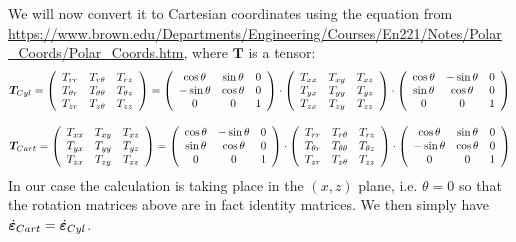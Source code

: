We will now convert it to Cartesian coordinates using the equation 
from \url{https://www.brown.edu/Departments/Engineering/Courses/En221/Notes/Polar_Coords/Polar_Coords.htm}, where ${\bm T}$ is a tensor:
\[
{\bm T}_{\tiny Cyl}=
\left(
\begin{array}{ccc}
T_{rr}       & T_{r\theta}      & T_{rz} \\
T_{\theta r} & T_{\theta\theta} & T_{\theta z} \\
T_{z r}      & T_{z \theta}     & T_{zz}
\end{array}
\right)
=
\left(
\begin{array}{ccc}
 \cos \theta&\sin \theta&0 \\
-\sin \theta&\cos \theta&0 \\
0 & 0 & 1 
\end{array}
\right)
\cdot
\left(
\begin{array}{ccc}
T_{xx} & T_{xy} & T_{xz} \\
T_{yx} & T_{yy} & T_{yz} \\
T_{zx} & T_{zy} & T_{zz} 
\end{array}
\right)
\cdot
\left(
\begin{array}{ccc}
\cos \theta & -\sin \theta&0 \\
\sin \theta &  \cos \theta&0 \\
0 & 0 & 1 
\end{array}
\right)
\]

\[
{\bm T}_{\tiny Cart}=
\left(
\begin{array}{ccc}
T_{xx} & T_{xy} & T_{xz} \\
T_{yx} & T_{yy} & T_{yz} \\
T_{zx} & T_{zy} & T_{zz} 
\end{array}
\right)
=
\left(
\begin{array}{ccc}
 \cos \theta&-\sin \theta&0 \\
\sin \theta&\cos \theta&0 \\
0 & 0 & 1 
\end{array}
\right)
\cdot
\left(
\begin{array}{ccc}
T_{rr}       & T_{r\theta}      & T_{rz} \\
T_{\theta r} & T_{\theta\theta} & T_{\theta z} \\
T_{z r}      & T_{z \theta}     & T_{zz}
\end{array}
\right)
\cdot
\left(
\begin{array}{ccc}
\cos \theta & \sin \theta&0 \\
-\sin \theta &  \cos \theta&0 \\
0 & 0 & 1 
\end{array}
\right)
\]
In our case the calculation is taking place in the $(x,z)$
plane, i.e. $\theta=0$ so that the rotation matrices above 
are in fact identity matrices. 
We then simply have 
$\dot{\bm \varepsilon}_{\tiny Cart}=
\dot{\bm \varepsilon}_{\tiny Cyl}$.




















